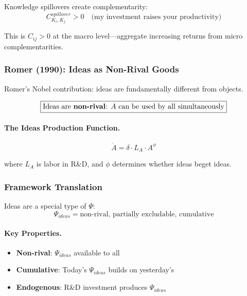 Knowledge spillovers create complementarity:
\begin{equation}
C_{K_i, K_j}^{spillover} > 0 \quad \text{(my investment raises your productivity)}
\end{equation}

This is $C_{ij} > 0$ at the macro level---aggregate increasing returns from 
micro complementarities.

\subsubsection{Romer (1990): Ideas as Non-Rival Goods}

Romer's Nobel contribution: ideas are fundamentally different from objects.

\begin{equation}
\boxed{
\text{Ideas are \textbf{non-rival}: } A \text{ can be used by all simultaneously}
}
\label{eq:romer90-nonrival}
\end{equation}

\paragraph{The Ideas Production Function.}
\begin{equation}
\dot{A} = \delta \cdot L_A \cdot A^\phi
\end{equation}

where $L_A$ is labor in R\&D, and $\phi$ determines whether ideas beget ideas.

\subsubsection{Framework Translation}

Ideas are a special type of $\Psi$:
\begin{equation}
\Psi_{ideas} = \text{non-rival, partially excludable, cumulative}
\end{equation}

\paragraph{Key Properties.}
\begin{itemize}
    \item \textbf{Non-rival}: $\Psi_{ideas}$ available to all
    \item \textbf{Cumulative}: Today's $\Psi_{ideas}$ builds on yesterday's
    \item \textbf{Endogenous}: R\&D investment produces $\Psi_{ideas}$
\end{itemize}

